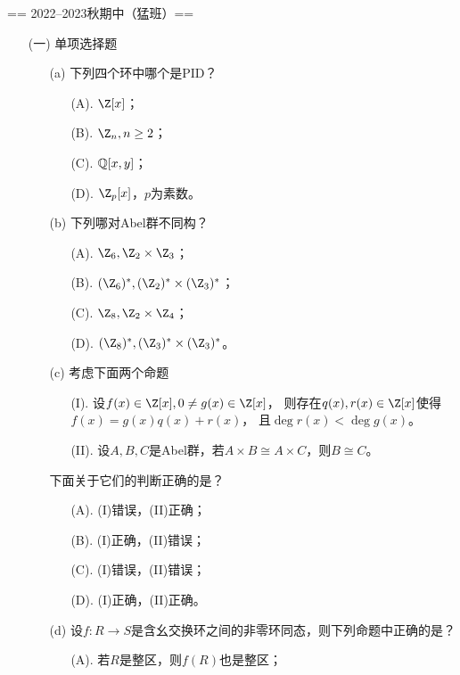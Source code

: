 == 2022--2023秋期中（猛班）==
\begin{itemize}
    \item[(一)]单项选择题
    \begin{itemize}
        \item[(a)]下列四个环中哪个是PID？
        \begin{itemize}
            \item[(A).]$\Z[x]$；
            \item[(B).]$\Z_n , n\ge 2$；
            \item[(C).]$\mathbb{Q} [x,y]$；
            \item[(D).]$\Z_p[x]$，$p$为素数。
        \end{itemize}
        \item[(b)]下列哪对Abel群$\textbf{不}$同构？
        \begin{itemize}
            \item[(A).]$\Z_6,\Z_2 \times \Z_3$；
            \item[(B).]$(\Z_6)^*,(\Z_2)^* \times (\Z_3)^*$；
            \item[(C).]$\Z_8,\Z_2 \times \Z_4$；
            \item[(D).]$(\Z_8)^*,(\Z_3)^* \times (\Z_3)^*$。
        \end{itemize}
        \item[(c)]考虑下面两个命题
        \begin{itemize}
            \item[(I).]设$f(x) \in \Z[x], 0 \neq g(x) \in \Z[x]$，
            则存在$q(x),r(x) \in \Z[x]$使得$f(x) = g(x)q(x) + r(x)$，
            且$\deg r(x) < \deg g(x)$。
            \item[(II).]设$A,B,C$是Abel群，若$A \times B \cong A \times C$，则$B \cong C$。
        \end{itemize}
        下面关于它们的判断$\textbf{正确}$的是？
        \begin{itemize}
            \item[(A).](I)错误，(II)正确；
            \item[(B).](I)正确，(II)错误；
            \item[(C).](I)错误，(II)错误；
            \item[(D).](I)正确，(II)正确。
        \end{itemize}
        \item[(d)]设$f:R \to S$是含幺交换环之间的非零环同态，则下列命题中$\textbf{正确}$的是？
        \begin{itemize}
            \item[(A).]若$R$是整区，则$f(R)$也是整区；

\end{itemize}
\end{itemize}
\end{itemize}
